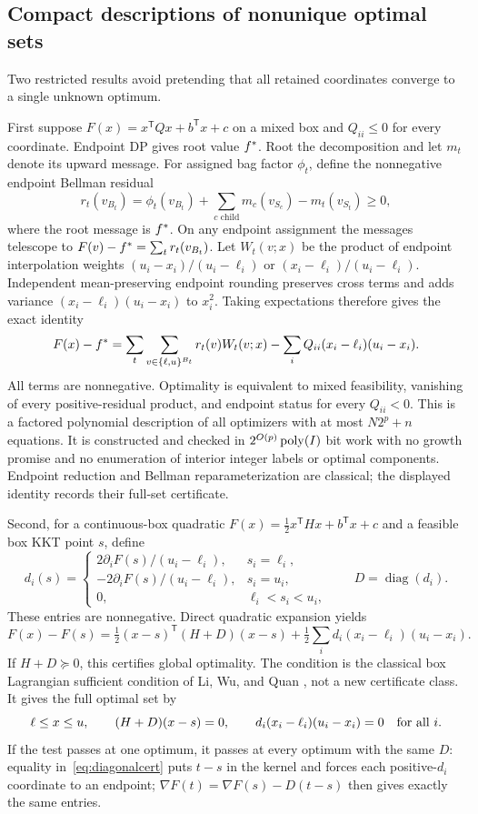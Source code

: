 \subsection{Compact descriptions of nonunique optimal sets}
Two restricted results avoid pretending that all retained coordinates
converge to a single unknown optimum.

First suppose $F(x)=x^{\mathsf T}Qx+b^{\mathsf T}x+c$ on a mixed box
and $Q_{ii}\le0$ for every coordinate. Endpoint DP gives root value
$f^*$. Root the decomposition and let $m_t$ denote its upward message.
For assigned bag factor $\phi_t$, define the nonnegative endpoint
Bellman residual
\[
r_t(v_{B_t})=\phi_t(v_{B_t})+\sum_{c\text{ child}}m_c(v_{S_c})
-m_t(v_{S_t})\ge0,
\]
where the root message is $f^*$. On any endpoint assignment the messages
telescope to $F(v)-f^*=\sum_tr_t(v_{B_t})$.
Let $W_t(v;x)$ be the product of endpoint interpolation weights
$(u_i-x_i)/(u_i-\ell_i)$ or $(x_i-\ell_i)/(u_i-\ell_i)$.
Independent mean-preserving endpoint rounding preserves cross terms and
adds variance $(x_i-\ell_i)(u_i-x_i)$ to $x_i^2$. Taking expectations
therefore gives the exact identity
\begin{equation}\label{eq:endpointset}
F(x)-f^*=
\sum_t\sum_{v\in\{\ell,u\}^{B_t}}r_t(v)W_t(v;x)
-\sum_iQ_{ii}(x_i-\ell_i)(u_i-x_i).
\end{equation}
All terms are nonnegative. Optimality is equivalent to mixed feasibility,
vanishing of every positive-residual product, and endpoint status for
every $Q_{ii}<0$. This is a factored polynomial description of all
optimizers with at most $N2^p+n$ equations. It is constructed and checked
in $2^{O(p)}\operatorname{poly}(I)$ bit work with no growth promise and no enumeration
of interior integer labels or optimal components. Endpoint reduction
and Bellman reparameterization are classical; the displayed identity
records their full-set certificate.

Second, for a continuous-box quadratic
$F(x)=\tfrac12x^{\mathsf T}Hx+b^{\mathsf T}x+c$ and a feasible box
KKT point $s$, define
\[
d_i(s)=\begin{cases}
2\partial_iF(s)/(u_i-\ell_i),&s_i=\ell_i,\\
-2\partial_iF(s)/(u_i-\ell_i),&s_i=u_i,\\
0,&\ell_i<s_i<u_i,
\end{cases}\qquad D=\operatorname{diag}(d_i).
\]
These entries are nonnegative. Direct quadratic expansion yields
\begin{equation}\label{eq:diagonalcert}
F(x)-F(s)=\tfrac12(x-s)^{\mathsf T}(H+D)(x-s)
+\tfrac12\sum_id_i(x_i-\ell_i)(u_i-x_i).
\end{equation}
If $H+D\succeq0$, this certifies global optimality. The condition is
the classical box Lagrangian sufficient condition of
Li, Wu, and Quan \cite{LiWuQuan2015}, not a new certificate class.
It gives the full optimal set by
\[
\ell\le x\le u,\qquad(H+D)(x-s)=0,\qquad
d_i(x_i-\ell_i)(u_i-x_i)=0\quad\hbox{for all }i.
\]
If the test passes at one optimum, it passes at every optimum with the
same $D$: equality in~\eqref{eq:diagonalcert} puts $t-s$ in the
kernel and forces each positive-$d_i$ coordinate to an endpoint;
$\nabla F(t)=\nabla F(s)-D(t-s)$ then gives exactly the same entries.

